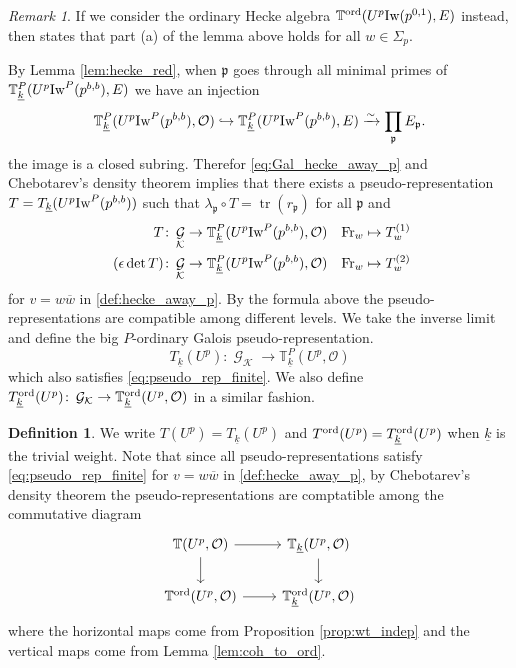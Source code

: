 \documentclass[leqno]{amsart}
\theoremstyle{definition}
\newtheorem{defn}[thm]{Definition}
\theoremstyle{remark}
\newtheorem{rem}[thm]{Remark}
\newcommand{\oo}{\mathcal{O}}
\DeclareMathOperator{\mtr}{tr}
\DeclareMathOperator{\Gal}{\mathcal{G}}
\newcommand{\Fr}{\textnormal{Fr}} %
\newcommand{\fp}{\mathfrak{p}}
\newcommand{\K}{{\mathcal{K}}} %
\newcommand{\bw}{{\overline{w}}}
\newcommand{\wt}[1]{\underline{ #1 }}
\newcommand{\Iw}{\textnormal{Iw}} %
\newcommand{\TT}{\mathbb{T}} %
\newcommand{\ord}{\textnormal{ord}} %
\begin{document}
\begin{rem}
If we consider the ordinary Hecke algebra
$\TT^{\ord}(U^p\Iw(p^{0,1}),E)$ instead,
then \cite[Cor 2.33]{ger} states that 
part (a) of the lemma above
holds for all $w\in\Sigma_p$.
\end{rem}

By Lemma \ref{lem:hecke_red},
when $\fp$ goes through all minimal primes
of $\TT^P_{\wt{k}}(U^p\Iw^P(p^{b,b}),E)$
we have an injection
\[
	\TT^P_{\wt{k}}(U^p\Iw^P(p^{b,b}),\oo)\hookrightarrow
	\TT^P_{\wt{k}}(U^p\Iw^P(p^{b,b}),E)\xrightarrow{\sim} 
	\prod_{\fp}E_{\fp}.
\]
the image is a closed subring.
Therefor \eqref{eq:Gal_hecke_away_p}
and Chebotarev's density theorem
implies that there exists
a pseudo-representation
$T=T_{\wt{k}}(U^p\Iw^P(p^{b,b}))$ 
such that $\lambda_\fp\circ T=\mtr(r_\fp)$ 
for all $\fp$ and
\begin{equation}\label{eq:pseudo_rep_finite}
\begin{aligned}
	T&\colon \Gal_{\K}
	\to \TT^P_{\wt{k}}(U^p\Iw^P(p^{b,b}),\oo)\quad
	\Fr_w\mapsto T_w^{(1)}\\\
	(\epsilon\det T)&\colon \Gal_{\K}
	\to \TT^P_{\wt{k}}(U^p\Iw^P(p^{b,b}),\oo)\quad
	\Fr_w\mapsto T_w^{(2)}
\end{aligned}
\end{equation}
for $v=w\bw$ in \eqref{def:hecke_away_p}.
By the formula above the pseudo-representations
are compatible among different levels.
We take the inverse limit and define
the big $P$-ordinary Galois pseudo-representation.
\[
T_{\wt{k}}(U^p)\colon \Gal_{\K} \to \TT^P_{\wt{k}}(U^p,\oo)
\]
which also satisfies \eqref{eq:pseudo_rep_finite}.
We also define 
$T_{\wt{k}}^{\ord}(U^p)\colon 
\Gal_{\K} \to \TT^{\ord}_{\wt{k}}(U^p,\oo)$
in a similar fashion.

\begin{defn}\label{def:big_Gal}
We write $T(U^p)=T_{\wt{k}}(U^p)$ and 
$T^{\ord}(U^p)=T_{\wt{k}}^{\ord}(U^p)$
when $\wt{k}$ is the trivial weight.
Note that since all pseudo-representations satisfy
\eqref{eq:pseudo_rep_finite}
for $v=w\bw$ in \eqref{def:hecke_away_p},
by Chebotarev's density theorem 
the pseudo-representations are comptatible among
the commutative diagram
\[
\begin{tikzcd}
    \TT(U^p,\oo) 
    \arrow[r] \arrow[d]&
    \TT_{\wt{k}}(U^p,\oo) 
    \arrow[d]\\
    \TT^{\ord}(U^p,\oo) 
    \arrow[r] &
    \TT^{\ord}_{\wt{k}}(U^p,\oo) 
\end{tikzcd}
\]
where the horizontal maps come from Proposition \ref{prop:wt_indep}
and the vertical maps come from Lemma \ref{lem:coh_to_ord}.
\end{defn}
\end{document}
